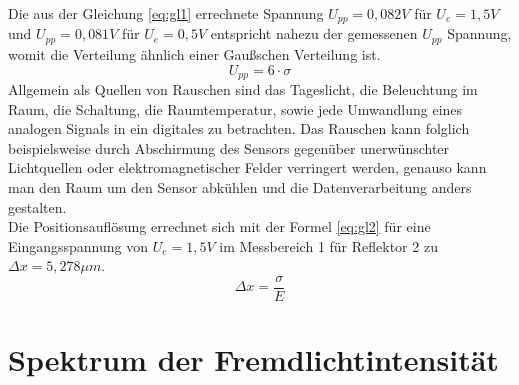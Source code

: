 Die aus der Gleichung \ref{eq:gl1} errechnete Spannung $U_{pp} = 0,082V$ für $U_e = 1,5V$ und $U_{pp} = 0,081V$ für $U_e = 0,5V$ entspricht nahezu der gemessenen $U_{pp}$ Spannung, womit die Verteilung ähnlich einer Gaußschen Verteilung ist.
\begin{equation}
	U_{pp} = 6 \cdot \sigma
	\label{eq:gl1}
\end{equation}
Allgemein als Quellen von Rauschen sind das Tageslicht, die Beleuchtung im Raum, die Schaltung, die Raumtemperatur, sowie jede Umwandlung eines analogen Signals in ein digitales zu betrachten. Das Rauschen kann folglich beispielsweise durch Abschirmung des Sensors gegenüber unerwünschter Lichtquellen oder elektromagnetischer Felder verringert werden, genauso kann man den Raum um den Sensor abkühlen und die Datenverarbeitung anders gestalten.
~\\
Die Positionsauflösung errechnet sich mit der Formel \ref{eq:gl2} für eine Eingangsspannung von $U_e = 1,5V$ im Messbereich 1 für Reflektor 2 zu $\Delta x = 5,278\mu m$.
\begin{equation}
	\Delta x = \dfrac{\sigma}{E}
	\label{eq:gl2}
\end{equation}

\section{Spektrum der Fremdlichtintensität}

